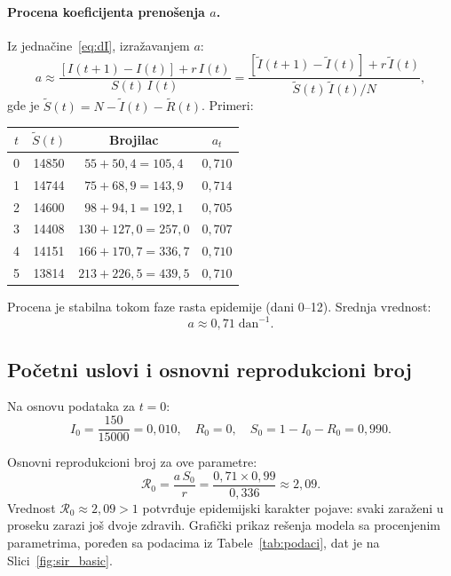 \documentclass[12pt,a4paper]{article}
\begin{document}
	\paragraph{Procena koeficijenta prenošenja $a$.}
	Iz jednačine~\eqref{eq:dI}, izražavanjem $a$:
	\begin{equation}
		a \approx \frac{[I(t+1)-I(t)] + r\,I(t)}{S(t)\,I(t)}
		= \frac{[\tilde{I}(t+1)-\tilde{I}(t)] + r\,\tilde{I}(t)}{\tilde{S}(t)\,\tilde{I}(t)/N},
		\label{eq:a_est}
	\end{equation}
	gde je $\tilde{S}(t)=N-\tilde{I}(t)-\tilde{R}(t)$. Primeri:
	
	\begin{center}
		\setlength{\tabcolsep}{8pt}
		\begin{tabular}{cccc}
			\toprule
			$t$ & $\tilde{S}(t)$ & Brojilac & $a_t$ \\
			\midrule
			0 & 14850 & $55+50{,}4=105{,}4$ & $0{,}710$ \\
			1 & 14744 & $75+68{,}9=143{,}9$ & $0{,}714$ \\
			2 & 14600 & $98+94{,}1=192{,}1$ & $0{,}705$ \\
			3 & 14408 & $130+127{,}0=257{,}0$ & $0{,}707$ \\
			4 & 14151 & $166+170{,}7=336{,}7$ & $0{,}710$ \\
			5 & 13814 & $213+226{,}5=439{,}5$ & $0{,}710$ \\
			\bottomrule
		\end{tabular}
	\end{center}
	
	Procena je stabilna tokom faze rasta epidemije (dani 0--12). Srednja vrednost:
	\begin{equation}
		\boxed{a \approx 0{,}71\;\mathrm{dan}^{-1}.}
		\label{eq:a_val}
	\end{equation}
	
	\subsection{Početni uslovi i osnovni reprodukcioni broj}
	
	Na osnovu podataka za $t=0$:
	\begin{equation}
		I_0 = \frac{150}{15000} = 0{,}010,\quad
		R_0 = 0,\quad
		S_0 = 1-I_0-R_0 = 0{,}990.
	\end{equation}
	
	Osnovni reprodukcioni broj za ove parametre:
	\begin{equation}
		\mathcal{R}_0 = \frac{a\,S_0}{r} = \frac{0{,}71\times 0{,}99}{0{,}336} \approx 2{,}09.
		\label{eq:R0_val}
	\end{equation}
	Vrednost $\mathcal{R}_0\approx 2{,}09 > 1$ potvrđuje epidemijski karakter pojave: svaki zaraženi
	u proseku zarazi još dvoje zdravih. Grafički prikaz rešenja modela sa procenjenim parametrima,
	poređen sa podacima iz Tabele~\ref{tab:podaci}, dat je na Slici~\ref{fig:sir_basic}.
	
\end{document}
